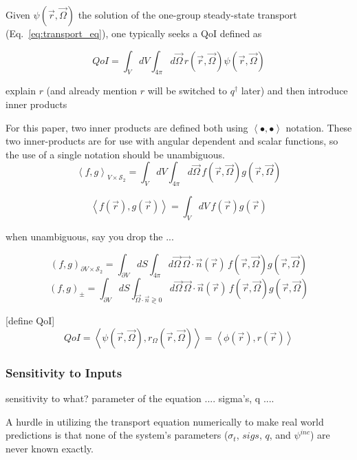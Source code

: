 \documentclass{article}
\newcommand{\vr}{\vec{r}}
\newcommand{\vO}{\vec{\Omega}}
\newcommand{\bra}{\left\langle}
\newcommand{\ket}{\right\rangle}
\newcommand{\vn}{\vec{n}}
\newcommand{\sigt}{\sigma_t}
\newcommand{\angResp}{r_\Omega}
\newcommand{\scalResp}{r}
\newcommand{\qoi}{QoI}
\begin{document}
Given $\psi(\vr,\vO)$ the solution of the one-group steady-state transport (Eq.~\eqref{eq:transport_eq}), one typically seeks a QoI
defined as

\[
\qoi =  \int_V dV \int_{4 \pi} d \vO \,  r(\vr, \vO) \psi(\vr, \vO)
\]

explain $r$ (and already mention $r$ will be switched to $q^\dag$ later) and then introduce inner products

For this paper, two inner products are defined both using $\bra \bullet , \bullet \ket$ notation. These two inner-products are for use with angular dependent and scalar functions, so the use of a single notation should be unambiguous.
\begin{equation}
\bra f , g \ket_{V \times \mathcal{S}_2}  = \int_V dV \int_{4 \pi} d \vO \,  f(\vr, \vO)g(\vr, \vO)
\end{equation}

\begin{equation}
\bra f(\vr) , g(\vr) \ket  = \int_V dV \,  f(\vr)g(\vr)
\end{equation}

when unambiguous, say you drop the ...

\begin{equation}
( f , g )_{\partial V \times \mathcal{S}_2}  = \int_{\partial V} dS \int_{4 \pi} d \vO \, \vO \cdot \vn(\vr) \, f(\vr, \vO)g(\vr, \vO)
\end{equation}
\begin{equation}
( f , g )_{\pm}   = \int_{\partial V} dS \int_{\vO \cdot \vn \gtrless 0} d\vO \,  \vO \cdot \vn(\vr) \, f(\vr, \vO)g(\vr, \vO)
\end{equation}


[define QoI]
\begin{equation}
\label{QoIDef}
\qoi = \bra \psi(\vr,\vO), \angResp(\vr,\vO) \ket = \bra \phi(\vr) , \scalResp(\vr) \ket
\end{equation}

\subsubsection{Sensitivity to Inputs}
sensitivity to what? parameter of the equation .... sigma's, q ....

A hurdle in utilizing the transport equation numerically to make real world predictions is that none of the system's parameters ($\sigt$, $sigs$, $q$, and $\psi^{inc}$) are never known exactly.
\end{document}
